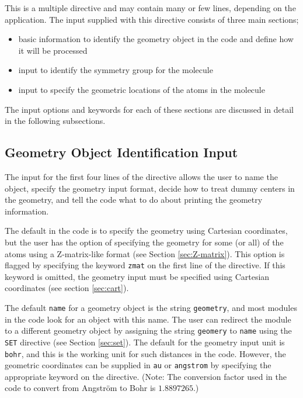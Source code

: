 This is a multiple directive and may contain many or few lines,
depending on the application.  The input supplied with this directive
consists of three main sections; 

\begin{itemize}
\item basic information to identify the geometry object in the code and
define how it will be processed
\item input to identify the symmetry group for the molecule
\item input to specify the geometric locations of the atoms in the molecule
\end{itemize}

The input options and keywords for each of these sections are
discussed in detail in the following subsections.  

\subsection{Geometry Object Identification Input}

The input for the first four lines of the directive allows the user to name 
the object, specify the geometry input format, decide how to treat dummy
centers in the geometry, and tell the code what to do about printing 
the geometry information.

The default in the code is to specify the geometry using
Cartesian coordinates, but the user has the option of specifying
the geometry for some (or all) of the atoms using a Z-matrix-like format
(see Section \ref{sec:Z-matrix}).
This option is flagged by specifying the keyword \verb+zmat+ on the
first line of the directive.  If this keyword is omitted, the geometry
input must be specified using Cartesian coordinates (see section 
\ref{sec:cart}).

The default \verb+name+ for a geometry object is the string \verb+geometry+,
and most modules in the code look for an object with this name.  
The user can redirect the module to a different geometry object by assigning
the string \verb+geomery+ to \verb+name+ using the \verb+SET+ directive 
(see Section \ref{sec:set}).  The default for the geometry input unit
is \verb+bohr+, and this is the working unit for such distances in the code.
However, the geometric coordinates can be supplied in \verb+au+ or 
\verb+angstrom+ by specifying the appropriate keyword on the directive.
(Note: The conversion factor used in the code to convert from Angstr\"{o}m 
to Bohr is $1.8897265$.)


